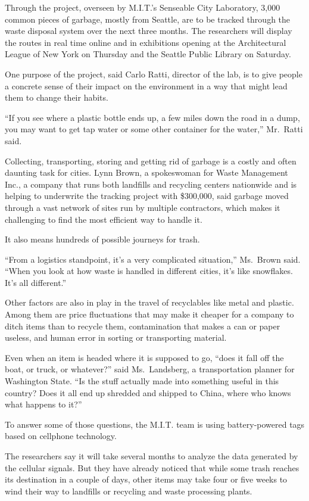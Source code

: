 ﻿\documentclass[12pt]{article}
\begin{document}
Through the project, overseen by M.I.T.'s Senseable City Laboratory, 3,000 common pieces of garbage,
mostly from Seattle, are to be tracked through the waste disposal system over the next three months.
The researchers will display the routes in real time online and in exhibitions opening at the
Architectural League of New York on Thursday and the Seattle Public Library on Saturday.

One purpose of the project, said Carlo Ratti, director of the lab, is to give people a concrete
sense of their impact on the environment in a way that might lead them to change their habits.

``If you see where a plastic bottle ends up, a few miles down the road in a dump, you may want to
get tap water or some other container for the water,'' Mr.~Ratti said.

Collecting, transporting, storing and getting rid of garbage is a costly and often daunting task for
cities. Lynn Brown, a spokeswoman for Waste Management Inc., a company that runs both landfills and
recycling centers nationwide and is helping to underwrite the tracking project with \$300,000, said
garbage moved through a vast network of sites run by multiple contractors, which makes it
challenging to find the most efficient way to handle it.

It also means hundreds of possible journeys for trash.

``From a logistics standpoint, it's a very complicated situation,'' Ms.~Brown said. ``When you look
at how waste is handled in different cities, it's like snowflakes. It's all different.''

Other factors are also in play in the travel of recyclables like metal and plastic. Among them are
price fluctuations that may make it cheaper for a company to ditch items than to recycle them,
contamination that makes a can or paper useless, and human error in sorting or transporting
material.

Even when an item is headed where it is supposed to go, ``does it fall off the boat, or truck, or
whatever?'' said Ms.~Landsberg, a transportation planner for Washington State. ``Is the stuff
actually made into something useful in this country? Does it all end up shredded and shipped to
China, where who knows what happens to it?''

To answer some of those questions, the M.I.T. team is using battery-powered tags based on cellphone
technology.

The researchers say it will take several months to analyze the data generated by the cellular
signals. But they have already noticed that while some trash reaches its destination in a couple of
days, other items may take four or five weeks to wind their way to landfills or recycling and waste
processing plants.
\end{document}
